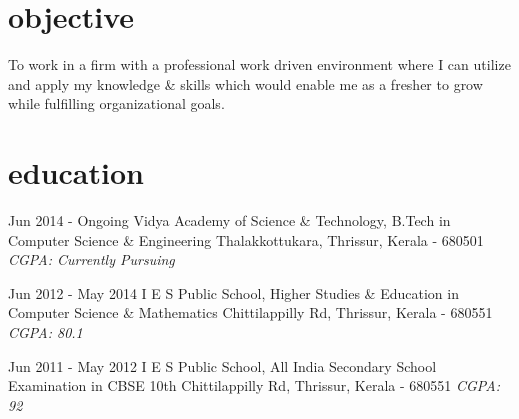 \documentclass[]{friggeri-cv}
\begin{document}
	
\newline

\section{objective}
\begin{entrylist}

	\entry
	{}
    {{\normalfont To work in a firm with a professional work driven environment where I can utilize and apply my knowledge \& skills which would enable me as a fresher to grow while fulfilling organizational goals.}}
    {\emph{}}
	{}
\end{entrylist}
\newline

\section{education}
\begin{entrylist}
	
	\entry
	{Jun 2014 - Ongoing}
	{Vidya Academy of Science \& Technology, {\normalfont B.Tech in Computer Science \& Engineering \newline}}
	{Thalakkottukara, Thrissur, Kerala - 680501}
	{\emph{CGPA: Currently Pursuing}}
	  
	
	\entry
	{Jun 2012 - May 2014}
	{I E S Public School, {\normalfont Higher Studies \& Education in Computer Science \& Mathematics \newline}}
	{Chittilappilly Rd, Thrissur, Kerala - 680551}
	{\emph{CGPA: 80.1}}
    
    
	\entry
	{Jun 2011 - May 2012}
	{I E S Public School, {\normalfont All India Secondary School Examination in CBSE 10th \newline }}
	{Chittilappilly Rd, Thrissur, Kerala - 680551}
	{\emph{CGPA: 92}}
	  
\end{entrylist}
\newline
\end{document}
